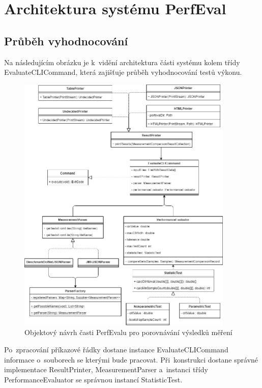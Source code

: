 \section{Architektura systému PerfEval}

\subsection{Průběh vyhodnocování}

Na následujícím obrázku je k~vidění architektura části systému kolem třídy EvaluateCLICommand, která zajišťuje
průběh vyhodnocování testů výkonu.

\begin{figure}[!ht]
    \centering
    \includegraphics[width=0.92\textwidth]{../img/perfeval_evaluate.png}
    \caption{Objektový návrh časti PerfEvalu pro porovnávání výsledků měření}
\end{figure}

Po~zpracování příkazové řádky dostane instance EvaluateCLICommand informace
o~souborech se kterými bude pracovat. Při~konstrukci dostane správné implementace ResultPrinter,
MeasurementParser a~instanci třídy PerformanceEvaluator se správnou instancí StatisticTest.

